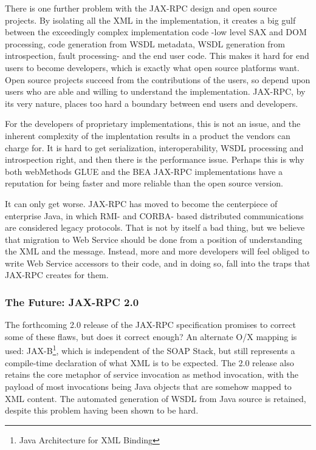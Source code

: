 There is one further problem with the JAX-RPC design and open source
projects. By isolating all the XML in the implementation, it creates a
big gulf between the exceedingly complex implementation code -low level
SAX and DOM processing, code generation from WSDL metadata, WSDL
generation from introspection, fault processing- and the end user code.
This makes it hard for end users to become developers, which is exactly
what open source platforms want. Open source projects succeed from the
contributions of the users, so depend upon users who are able and
willing to understand the implementation. JAX-RPC, by its very nature,
places too hard a boundary between end users and developers.

For the developers of proprietary implementations, this is not an issue,
and the inherent complexity of the implentation results in a product the
vendors can charge for. It is hard to get serialization,
interoperability, WSDL processing and introspection right, and then
there is the performance issue. Perhaps this is why both webMethods GLUE
and the BEA JAX-RPC implementations have a reputation for being faster
and more reliable than the open source version. 

It can only get worse. JAX-RPC has moved to become the centerpiece of
enterprise Java, in which RMI- and CORBA- based distributed
communications are considered legacy protocols. That is not by itself a
bad thing, but we believe that migration to Web Service should be done
from a position of understanding the XML and the message. Instead, more
and more developers will feel obliged to write Web Service accessors to
their code, and in doing so, fall into the traps that JAX-RPC creates
for them.

\subsubsection{The Future: JAX-RPC 2.0}

The forthcoming 2.0 release of the JAX-RPC specification promises to
correct some of these flaws, but does it correct enough? An alternate
O/X mapping is used: JAX-B\footnote{Java Architecture for XML
Binding}, which is independent of the SOAP Stack, but still represents
a compile-time declaration of what XML is to be expected. The 2.0
release also retains the core metaphor of service invocation as method
invocation, with the payload of most invocations being Java objects
that are somehow mapped to XML content. The automated generation of
WSDL from Java source is retained, despite this problem having been
shown to be hard.

